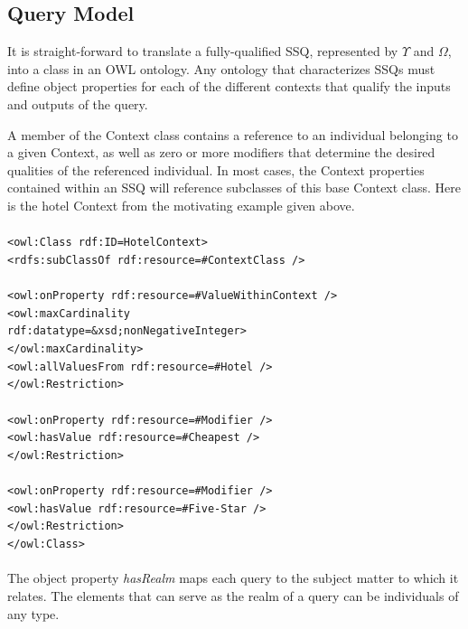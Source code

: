 \documentclass{IOS-Book-Article}
\begin{document}


\subsection{Query Model}

It is straight-forward to translate a fully-qualified SSQ, represented by $\Upsilon$ and $\Omega$, into a class in an OWL ontology.  Any ontology that characterizes SSQs must define object properties for each of the different contexts that qualify the inputs and outputs of the query.

A member of the Context class contains a reference to an individual belonging to a given Context, as well as zero or more modifiers that determine the desired qualities of the referenced individual.  In most cases, the Context properties contained within an SSQ will reference subclasses of this base Context class. Here is the hotel Context from the motivating example given above.
\texttt{\small{
\\
\\
\indent <owl:Class rdf:ID=\textquotedbl{}HotelContext\textquotedbl{}>\\
\indent \indent <rdfs:subClassOf rdf:resource=\textquotedbl{}\#ContextClass\textquotedbl{} />\\
\indent {}\\
\indent \indent \indent <owl:onProperty rdf:resource=\textquotedbl{}\#ValueWithinContext\textquotedbl{} />\\
\indent \indent \indent <owl:maxCardinality \\
\indent \indent \indent \qquad rdf:datatype=\textquotedbl{}\&xsd;nonNegativeInteger\textquotedbl{}>
\\\indent \indent \indent {}</owl:maxCardinality>\\
\indent \indent \indent <owl:allValuesFrom rdf:resource=\textquotedbl{}\#Hotel\textquotedbl{} />\\
\indent \indent </owl:Restriction>\\
\indent {}\\
\indent \indent \indent <owl:onProperty rdf:resource=\textquotedbl{}\#Modifier\textquotedbl{} />\\
\indent \indent \indent <owl:hasValue rdf:resource=\textquotedbl{}\#Cheapest\textquotedbl{} />\\
\indent \indent </owl:Restriction>\\
\indent {}\\
\indent \indent \indent <owl:onProperty rdf:resource=\textquotedbl{}\#Modifier\textquotedbl{} />\\
\indent \indent \indent <owl:hasValue rdf:resource=\textquotedbl{}\#Five-Star\textquotedbl{} />\\
\indent \indent </owl:Restriction>\\
\indent </owl:Class>\\
\\	 
}}
The object property \emph{hasRealm} maps each query to the subject matter to which it relates.  The elements that can serve as the realm of a query can be individuals of any type.
\end{document}
